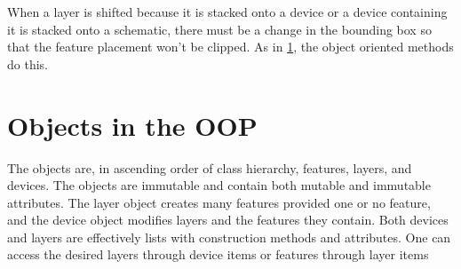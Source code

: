 \documentclass{article}
\begin{document}
When a layer is shifted because it is stacked onto a device or a device containing it is stacked onto a schematic, there must be a change in the bounding box so that the feature placement won't be clipped. As in \ref{sec:oop}, the object oriented methods do this.

\section{Objects in the OOP}\label{sec:oop}
The objects are, in ascending order of class hierarchy, features, layers, and devices. The objects are immutable and contain both mutable and immutable attributes. The layer object creates many features provided one or no feature, and the device object modifies layers and the features they contain. Both devices and layers are effectively lists with construction methods and attributes. One can access the desired layers through device items or features through layer items
\end{document}
